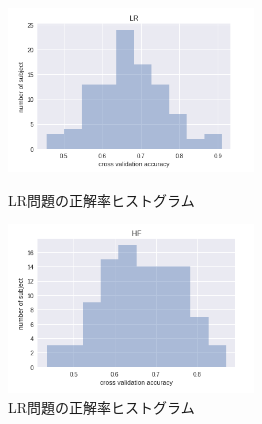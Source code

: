\begin{figure}[t]
    \begin{minipage}{0.5\hsize}
     \begin{center}
      \includegraphics[width=65mm]{images/LR.png}
     \end{center}
     \caption{LR問題の正解率ヒストグラム}
     \label{fig:LRhist}
    \end{minipage}
    \begin{minipage}{0.5\hsize}
     \begin{center}
      \includegraphics[width=65mm]{images/HF.png}
     \end{center}
     \caption{LR問題の正解率ヒストグラム}
     \label{fig:HFhist}
    \end{minipage}
\end{figure}
